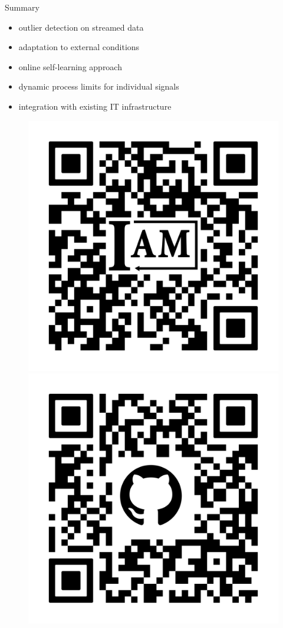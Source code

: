 \documentclass[aspectratio=169]{beamer}
\begin{document}
\begin{frame}{Summary}
    \renewcommand{\figurename}{}
    \begin{minipage}[c]{0.6\linewidth}
        \begin{itemize}
            \item outlier detection on streamed data
            \item adaptation to external conditions
            \item online self-learning approach
            \item dynamic process limits for individual signals
            \item integration with existing IT infrastructure
        \end{itemize}
        \begin{figure}[htpb]
            \begin{center}
                \includegraphics[width=0.2\linewidth]{figures/qr_uiam_squares_logo.pdf}\hfil
                \includegraphics[width=0.2\linewidth]{figures/qr_pc2023_squares.pdf}
            \end{center}
        \end{figure}
    \end{minipage}\hspace{1pt}
    \begin{minipage}{0.38\linewidth}
        \begin{figure}[htpb]
            \begin{center}

\end{center}
\end{figure}
\end{minipage}
\end{frame}
\end{document}
